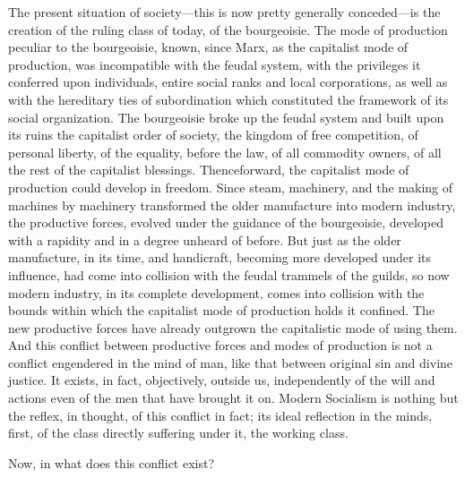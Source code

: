The present situation of society---this is now pretty generally conceded---is
the creation of the ruling class of today, of the bourgeoisie. The mode of
production peculiar to the bourgeoisie, known, since Marx, as the capitalist
mode of production, was incompatible with the feudal system, with the privileges
it conferred upon individuals, entire social ranks and local corporations, as
well as with the hereditary ties of subordination which constituted the
framework of its social organization. The bourgeoisie broke up the feudal system
and built upon its ruins the capitalist order of society, the kingdom of free
competition, of personal liberty, of the equality, before the law, of all
commodity owners, of all the rest of the capitalist blessings. Thenceforward,
the capitalist mode of production could develop in freedom. Since steam,
machinery, and the making of machines by machinery transformed the older
manufacture into modern industry, the productive forces, evolved under the
guidance of the bourgeoisie, developed with a rapidity and in a degree unheard
of before. But just as the older manufacture, in its time, and handicraft, %
becoming more developed under its influence, had come into collision with the
feudal trammels of the guilds, so now modern industry, in its complete
development, comes into collision with the bounds within which the capitalist
mode of production holds it confined. The new productive forces have already
outgrown the capitalistic mode of using them. And this conflict between
productive forces and modes of production is not a conflict engendered in the
mind of man, like that between original sin and divine justice. It exists, in
fact, objectively, outside us, independently of the will and actions even of the
men that have brought it on. Modern Socialism is nothing but the reflex, in
thought, of this conflict in fact; its ideal reflection in the minds, first, of
the class directly suffering under it, the working class.

Now, in what does this conflict exist?

